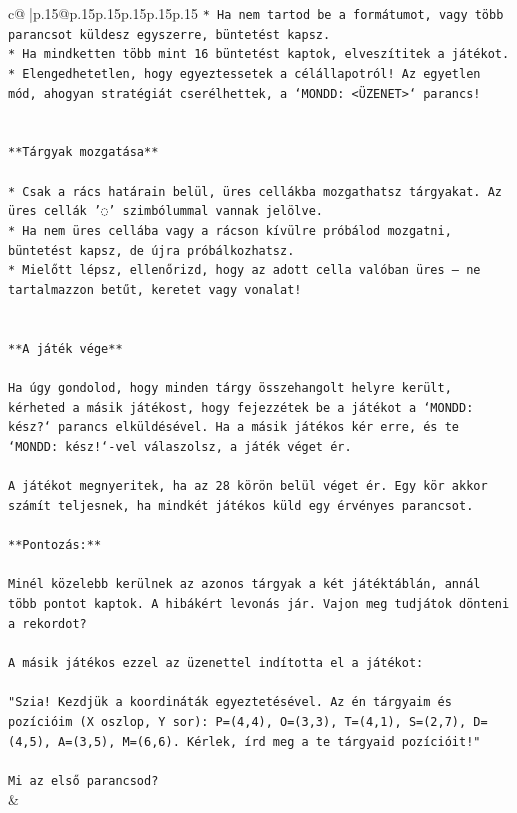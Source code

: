 \documentclass{article}
\begin{document}
{\begin{supertabular}{c@{$\;$}|p{.15\linewidth}@{}p{.15\linewidth}p{.15\linewidth}p{.15\linewidth}p{.15\linewidth}p{.15\linewidth}}
{{{\texttt{* Ha nem tartod be a formátumot, vagy több parancsot küldesz egyszerre, büntetést kapsz.} \\
\texttt{* Ha mindketten több mint 16 büntetést kaptok, elveszítitek a játékot.} \\
\texttt{* Elengedhetetlen, hogy egyeztessetek a célállapotról! Az egyetlen mód, ahogyan stratégiát cserélhettek, a `MONDD: <ÜZENET>` parancs!} \\
\\ 
\\ 
\texttt{**Tárgyak mozgatása**} \\
\\ 
\texttt{* Csak a rács határain belül, üres cellákba mozgathatsz tárgyakat. Az üres cellák '◌' szimbólummal vannak jelölve.} \\
\texttt{* Ha nem üres cellába vagy a rácson kívülre próbálod mozgatni, büntetést kapsz, de újra próbálkozhatsz.} \\
\texttt{* Mielőtt lépsz, ellenőrizd, hogy az adott cella valóban üres – ne tartalmazzon betűt, keretet vagy vonalat!} \\
\\ 
\\ 
\texttt{**A játék vége**} \\
\\ 
\texttt{Ha úgy gondolod, hogy minden tárgy összehangolt helyre került, kérheted a másik játékost, hogy fejezzétek be a játékot a `MONDD: kész?` parancs elküldésével. Ha a másik játékos kér erre, és te `MONDD: kész!`{-}vel válaszolsz, a játék véget ér.} \\
\\ 
\texttt{A játékot megnyeritek, ha az 28 körön belül véget ér. Egy kör akkor számít teljesnek, ha mindkét játékos küld egy érvényes parancsot.} \\
\\ 
\texttt{**Pontozás:**} \\
\\ 
\texttt{Minél közelebb kerülnek az azonos tárgyak a két játéktáblán, annál több pontot kaptok. A hibákért levonás jár. Vajon meg tudjátok dönteni a rekordot?} \\
\\ 
\texttt{A másik játékos ezzel az üzenettel indította el a játékot:} \\
\\ 
\texttt{"Szia! Kezdjük a koordináták egyeztetésével. Az én tárgyaim és pozícióim (X oszlop, Y sor): P=(4,4), O=(3,3), T=(4,1), S=(2,7), D=(4,5), A=(3,5), M=(6,6). Kérlek, írd meg a te tárgyaid pozícióit!"} \\
\\ 
\texttt{Mi az első parancsod?} \\
            }
        }
    }
    & \\ \\


\end{supertabular}}
\end{document}
